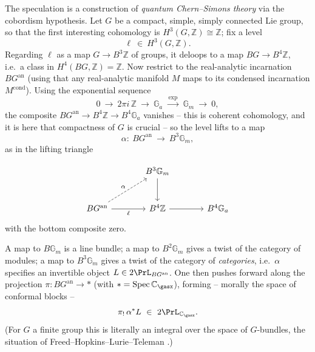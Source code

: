 The speculation is a construction of \emph{quantum Chern--Simons theory} via the
cobordism hypothesis. Let $G$ be a compact, simple, simply connected Lie group,
so that the first interesting cohomology is $H^3(G,\mathbb Z)\cong\mathbb Z$; fix
a level
\begin{equation*}
\ell\ \in\ H^3(G,\mathbb Z).
\end{equation*}
Regarding $\ell$ as a map $G\to B^3\mathbb Z$ of groups, it deloops to a map
$BG\to B^4\mathbb Z$, i.e.\ a class in $H^4(BG,\mathbb Z)=\mathbb Z$. Now restrict
to the real-analytic incarnation $BG^{\mathrm{an}}$ (using that any real-analytic
manifold $M$ maps to its condensed incarnation $M^{\mathrm{cond}}$). Using the
exponential sequence
\begin{equation}
\label{eq:24:exponential}
0\ \longrightarrow\ 2\pi i\,\mathbb Z\ \longrightarrow\ \mathbb G_a\
\xrightarrow{\ \exp\ }\ \mathbb G_m\ \longrightarrow\ 0 ,
\end{equation}
the composite $BG^{\mathrm{an}}\to B^4\mathbb Z\to B^4\mathbb G_a$ vanishes --
this is coherent cohomology, and it is here that compactness of $G$ is crucial
-- so the level lifts to a map
\begin{equation*}
\alpha\colon\ BG^{\mathrm{an}}\ \longrightarrow\ B^3\mathbb G_m ,
\end{equation*}
as in the lifting triangle

\begin{equation*}
\begin{tikzcd}[column sep=large, row sep=large]
& B^3\mathbb G_m \arrow[d] \\
BG^{\mathrm{an}} \arrow[ur, "\alpha", dashed]
  \arrow[r, "\ell"'] & B^4\mathbb Z \arrow[r] & B^4\mathbb G_a
\end{tikzcd}
\end{equation*}
with the bottom composite zero.

A map to $B\mathbb G_m$ is a line bundle; a map to $B^2\mathbb G_m$ gives a twist
of the category of modules; a map to $B^3\mathbb G_m$ gives a twist of the
category of \emph{categories}, i.e.\ $\alpha$ specifies an invertible object
$L\in 2\PrL_{BG^{\mathrm{an}}}$. One then pushes forward along the projection
$\pi\colon BG^{\mathrm{an}}\to\ast$ (with $\ast=\operatorname{Spec}\mathbb C_{\gasx}$), forming
-- morally the space of conformal blocks --
\begin{equation}
\label{eq:24:conformal-blocks}
\pi_!\,\alpha^*L\ \in\ 2\PrL_{\mathbb C_{\gasx}} .
\end{equation}
(For $G$ a finite group this is literally an integral over the space of
$G$-bundles, the situation of Freed--Hopkins--Lurie--Teleman
\cite{freed2009topologicalquantumfieldtheories}.)

